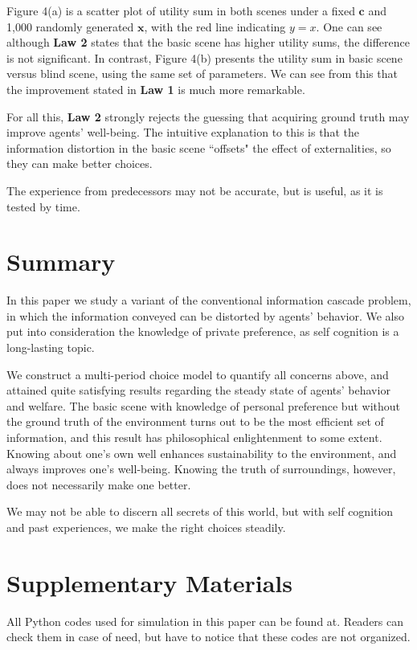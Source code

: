 \documentclass[12pt,english]{article}
\theoremstyle{plain}
\theoremstyle{plain}
\begin{document}
	Figure 4(a) is a scatter plot of utility sum in both scenes under a fixed $\mathbf{c}$ and 1,000 randomly generated $\mathbf{x}$, with the red line indicating $y = x$. One can see although \textbf{Law 2} states that the basic scene has higher utility sums, the difference is not significant. In contrast, Figure 4(b) presents the utility sum in basic scene versus blind scene, using the same set of parameters. We can see from this that the improvement stated in \textbf{Law 1} is much more remarkable.\par 
	
	For all this, \textbf{Law 2} strongly rejects the guessing that acquiring ground truth may improve agents' well-being. The intuitive explanation to this is that the information distortion in the basic scene ``offsets" the effect of externalities, so they can make better choices. \par 
	The experience from predecessors may not be accurate, but is useful, as it is tested by time.\par
	
	\section{Summary}
	In this paper we study a variant of the conventional information cascade problem, in which the information conveyed can be distorted by agents' behavior. We also put into consideration the knowledge of private preference, as self cognition is a long-lasting topic.\par 
	
	We construct a multi-period choice model to quantify all concerns above, and attained quite satisfying results regarding the steady state of agents' behavior and welfare. The basic scene with knowledge of personal preference but without the ground truth of the environment turns out to be the most efficient set of information, and this result has philosophical enlightenment to some extent. Knowing about one's own well enhances sustainability to the environment, and always improves one's well-being. Knowing the truth of surroundings, however, does not necessarily make one better.\par 
	
	We may not be able to discern all secrets of this world, but with self cognition and past experiences, we make the right choices steadily.
	
	






\appendix

\section{Supplementary Materials}
All Python codes used for simulation in this paper can be found at. Readers can check them in case of need, but have to notice that these codes are not organized.
\end{document}
